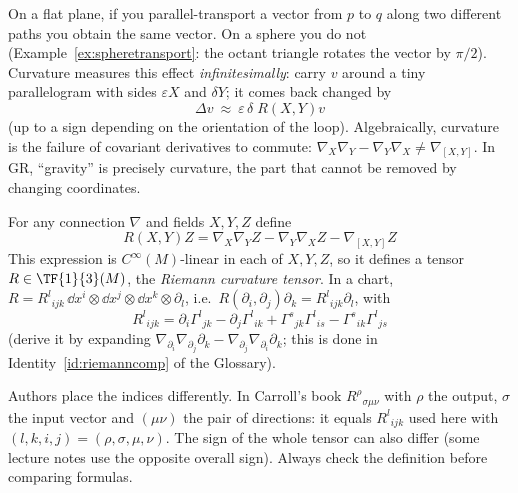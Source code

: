 \begin{intuition}[{curvature = failure of parallel transport to be path independent}]
On a flat plane, if you parallel-transport a vector from $p$ to $q$ along two different paths you obtain the same vector. On a sphere you do not (Example~\ref{ex:spheretransport}: the octant triangle rotates the vector by $\pi/2$). Curvature measures this effect \emph{infinitesimally}: carry $v$ around a tiny parallelogram with sides $\varepsilon X$ and $\delta Y$; it comes back changed by
\[
\Delta v\ \approx\ \varepsilon\,\delta\; R(X,Y)v
\]
(up to a sign depending on the orientation of the loop). Algebraically, curvature is the failure of covariant derivatives to commute: $\nabla_X\nabla_Y-\nabla_Y\nabla_X\neq\nabla_{[X,Y]}$. In GR, ``gravity'' is precisely curvature, the part that cannot be removed by changing coordinates.
\end{intuition}

\begin{formal}
For any connection $\nabla$ and fields $X,Y,Z$ define
\[
\boxed{\ R(X,Y)Z=\nabla_X\nabla_YZ-\nabla_Y\nabla_XZ-\nabla_{[X,Y]}Z\ }
\]
This expression is $C^\infty(M)$-linear in each of $X,Y,Z$, so it defines a tensor $R\in\TF{1}{3}(M)$, the \emph{Riemann curvature tensor}. In a chart, $R=R^l{}_{ijk}\,\dd x^i\otimes\dd x^j\otimes\dd x^k\otimes\partial_l$, i.e.\ $R(\partial_i,\partial_j)\partial_k=R^l{}_{ijk}\partial_l$, with
\begin{equation}\label{eq:riemanncomp}
\boxed{\ R^l{}_{ijk}=\partial_i\Gamma^l{}_{jk}-\partial_j\Gamma^l{}_{ik}+\Gamma^s{}_{jk}\Gamma^l{}_{is}-\Gamma^s{}_{ik}\Gamma^l{}_{js}\ }
\end{equation}
(derive it by expanding $\nabla_{\partial_i}\nabla_{\partial_j}\partial_k-\nabla_{\partial_j}\nabla_{\partial_i}\partial_k$; this is done in Identity~\ref{id:riemanncomp} of the Glossary).%
\end{formal}
\begin{pitfall}[{index conventions}]
Authors place the indices differently. In Carroll's book \cite{Carroll} $R^\rho{}_{\sigma\mu\nu}$ with $\rho$ the output, $\sigma$ the input vector and $(\mu\nu)$ the pair of directions: it equals $R^l{}_{ijk}$ used here with $(l,k,i,j)=(\rho,\sigma,\mu,\nu)$. The sign of the whole tensor can also differ (some lecture notes use the opposite overall sign). Always check the definition before comparing formulas.
\end{pitfall}

